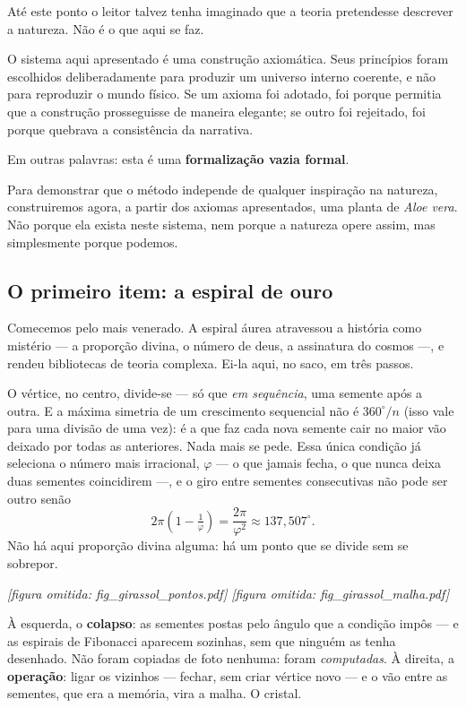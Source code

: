 \documentclass[11pt]{article}
\theoremstyle{plain}
\theoremstyle{remark}
\begin{document}
Até este ponto o leitor talvez tenha imaginado que a teoria pretendesse descrever a
natureza. Não é o que aqui se faz.

O sistema aqui apresentado é uma construção axiomática. Seus princípios foram
escolhidos deliberadamente para produzir um universo interno coerente, e não para
reproduzir o mundo físico. Se um axioma foi adotado, foi porque permitia que a
construção prosseguisse de maneira elegante; se outro foi rejeitado, foi porque
quebrava a consistência da narrativa.

Em outras palavras: esta é uma \textbf{formalização vazia formal}.

Para demonstrar que o método independe de qualquer inspiração na natureza,
construiremos agora, a partir dos axiomas apresentados, uma planta de \emph{Aloe
vera}. Não porque ela exista neste sistema, nem porque a natureza opere assim, mas
simplesmente porque podemos.

\subsection{O primeiro item: a espiral de ouro}

Comecemos pelo mais venerado. A espiral áurea atravessou a história como mistério
--- a proporção divina, o número de deus, a assinatura do cosmos ---, e rendeu
bibliotecas de teoria complexa. Ei-la aqui, no saco, em três passos.

O vértice, no centro, divide-se --- só que \emph{em sequência}, uma semente após a
outra. E a máxima simetria de um crescimento sequencial não é $360^\circ/n$ (isso
vale para uma divisão de uma vez): é a que faz cada nova semente cair no maior vão
deixado por todas as anteriores. Nada mais se pede. Essa única condição já seleciona
o número mais irracional, $\varphi$ --- o que jamais fecha, o que nunca deixa duas
sementes coincidirem ---, e o giro entre sementes consecutivas não pode ser outro
senão
\[
2\pi\left(1-\tfrac{1}{\varphi}\right)=\frac{2\pi}{\varphi^{2}}\approx 137{,}507^\circ.
\]
Não há aqui proporção divina alguma: há um ponto que se divide sem se sobrepor.

\begin{center}
\emph{[figura omitida: fig\_girassol\_pontos.pdf]}\hfill
\emph{[figura omitida: fig\_girassol\_malha.pdf]}
\end{center}

À esquerda, o \textbf{colapso}: as sementes postas pelo ângulo que a condição impôs
--- e as espirais de Fibonacci aparecem sozinhas, sem que ninguém as tenha desenhado.
Não foram copiadas de foto nenhuma: foram \emph{computadas}. À direita, a
\textbf{operação}: ligar os vizinhos --- fechar, sem criar vértice novo --- e o vão
entre as sementes, que era a memória, vira a malha. O cristal.
\end{document}
